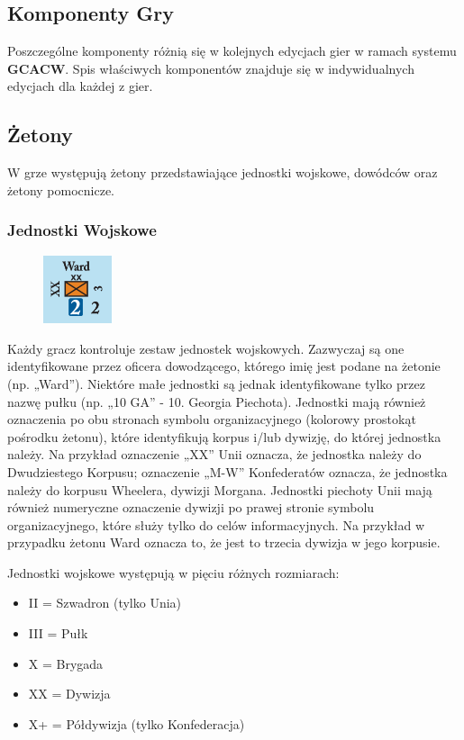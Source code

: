 \documentclass[10pt,twoside,a4paper,table]{article}
\begin{document}
\begin{multicols*}{2}
	\subsection{Komponenty Gry}
	Poszczególne komponenty różnią się w kolejnych edycjach gier w ramach systemu \textbf{GCACW}. Spis właściwych komponentów znajduje się w indywidualnych edycjach dla każdej z gier. 
	\subsection{Żetony}
	W grze występują żetony przedstawiające jednostki wojskowe, dowódców oraz żetony pomocnicze.
	\subsubsection*{Jednostki Wojskowe}
	\begin{figure}
		\includegraphics[width=2cm, height=2cm]{unit_1.png} 
	\end{figure}
	Każdy gracz kontroluje zestaw jednostek wojskowych. Zazwyczaj są one identyfikowane przez oficera dowodzącego, którego imię jest podane na żetonie (np. „Ward”). Niektóre małe jednostki są jednak identyfikowane tylko przez nazwę pułku (np. „10 GA” - 10. Georgia Piechota). Jednostki mają również oznaczenia po obu stronach symbolu organizacyjnego (kolorowy prostokąt pośrodku żetonu), które identyfikują korpus i/lub dywizję, do której jednostka należy. Na przykład oznaczenie „XX” Unii oznacza, że jednostka należy do Dwudziestego Korpusu; oznaczenie „M-W” Konfederatów oznacza, że jednostka należy do korpusu Wheelera, dywizji Morgana. Jednostki piechoty Unii mają również numeryczne oznaczenie dywizji po prawej stronie symbolu organizacyjnego, które służy tylko do celów informacyjnych. Na przykład w przypadku żetonu Ward oznacza to, że jest to trzecia dywizja w jego korpusie.\par
	Jednostki wojskowe występują w pięciu różnych rozmiarach:
	\begin{itemize}
		\item[] II = Szwadron (tylko Unia)
		\item[] III = Pułk
		\item[] X = Brygada
		\item[] XX = Dywizja
		\item[] X+ = Półdywizja (tylko Konfederacja)

\end{itemize}
\end{multicols*}
\end{document}

